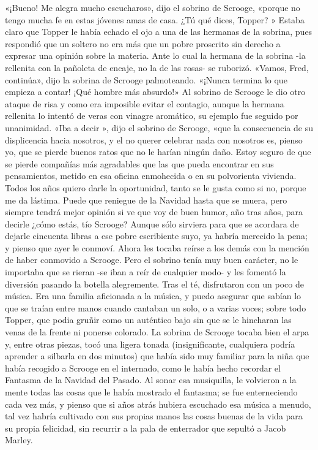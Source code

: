 \documentclass{novela}
\begin{document}
 «¡Bueno! Me alegra mucho escucharos», dijo el sobrino de Scrooge, «porque no tengo mucha fe en estas jóvenes amas de casa. ¿Tú qué dices, Topper? »
 Estaba claro que Topper le había echado el ojo a una de las hermanas de la sobrina, pues respondió que un soltero no era más que un pobre proscrito sin derecho a expresar una opinión sobre la materia. Ante lo cual la hermana de la sobrina -la rellenita con la pañoleta de encaje, no la de las rosas- se ruborizó.
 «Vamos, Fred, continúa», dijo la sobrina de Scrooge palmoteando. «¡Nunca termina lo que empieza a contar! ¡Qué hombre más absurdo!»
 Al sobrino de Scrooge le dio otro ataque de risa y como era imposible evitar el contagio, aunque la hermana rellenita lo intentó de veras con vinagre aromático, su ejemplo fue seguido por unanimidad.
 «Iba a decir », dijo el sobrino de Scrooge, «que la consecuencia de su displicencia hacia nosotros, y el no querer celebrar nada con nosotros es, pienso yo, que se pierde buenos ratos que no le harían ningún daño. Estoy seguro de que se pierde compañías más agradables que las que pueda encontrar en sus pensamientos, metido en esa oficina enmohecida o en su polvorienta vivienda. Todos los años quiero darle la oportunidad, tanto se le gusta como si no, porque me da lástima. Puede que reniegue de la Navidad hasta que se muera, pero siempre tendrá mejor opinión si ve que voy de buen humor, año tras años, para decirle ¿cómo estás, tío Scrooge? Aunque sólo sirviera para que se acordara de dejarle cincuenta libras a ese pobre escribiente suyo, ya habría merecido la pena; y pienso que ayer le conmoví.
 Ahora les tocaba reírse a los demás con la mención de haber conmovido a Scrooge. Pero el sobrino tenía muy buen carácter, no le importaba que se rieran -se iban a reír de cualquier modo- y les fomentó la diversión pasando la botella alegremente.
 Tras el té, disfrutaron con un poco de música. Era una familia aficionada a la música, y puedo asegurar que sabían lo que se traían entre manos cuando cantaban un solo, o a varias voces; sobre todo Topper, que podia gruñir como un auténtico bajo sin que se le hincharan las venas de la frente ni ponerse colorado. La sobrina de Scrooge tocaba bien el arpa y, entre otras piezas, tocó una ligera tonada (insignificante, cualquiera podría aprender a silbarla en dos minutos) que había sido muy familiar para la niña que había recogido a Scrooge en el internado, como le había hecho recordar el Fantasma de la Navidad del Pasado. Al sonar esa musiquilla, le volvieron a la mente todas las cosas que le había mostrado el fantasma; se fue enterneciendo cada vez más, y pienso que si años atrás hubiera escuchado esa música a menudo, tal vez habría cultivado con sus propias manos las cosas buenas de la vida para su propia felicidad, sin recurrir a la pala de enterrador que sepultó a Jacob Marley.
\end{document}
